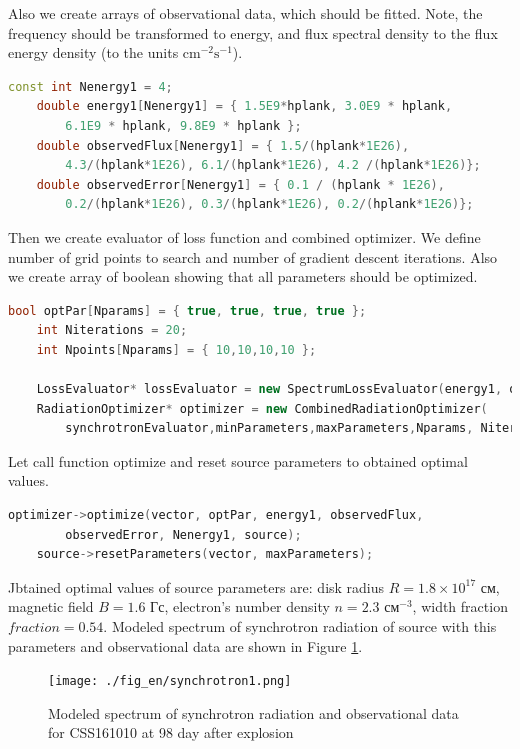 Also we create arrays of observational data, which should be fitted. Note, the frequency should be transformed to energy, and flux spectral density to the flux energy density (to the units $\text{cm}^{-2}\text{s}^{-1}$). 
\begin{lstlisting}[language=c++]
    const int Nenergy1 = 4;
    double energy1[Nenergy1] = { 1.5E9*hplank, 3.0E9 * hplank, 
    	6.1E9 * hplank, 9.8E9 * hplank };
    double observedFlux[Nenergy1] = { 1.5/(hplank*1E26), 
    	4.3/(hplank*1E26), 6.1/(hplank*1E26), 4.2 /(hplank*1E26)};
    double observedError[Nenergy1] = { 0.1 / (hplank * 1E26), 
    	0.2/(hplank*1E26), 0.3/(hplank*1E26), 0.2/(hplank*1E26)};
\end{lstlisting}
Then we create evaluator of loss function and combined optimizer. We define number of grid points to search and number of gradient descent iterations. Also we create array of boolean showing that all parameters should be optimized.
\begin{lstlisting}[language=c++]
    bool optPar[Nparams] = { true, true, true, true };
    int Niterations = 20;
    int Npoints[Nparams] = { 10,10,10,10 };
    
    LossEvaluator* lossEvaluator = new SpectrumLossEvaluator(energy1, observedFlux, observedError, Nenergy1, source);
    RadiationOptimizer* optimizer = new CombinedRadiationOptimizer(
        synchrotronEvaluator,minParameters,maxParameters,Nparams, Niterations,Npoints, lossEvaluator);
\end{lstlisting}
Let call function optimize and reset source parameters to obtained optimal values.
\begin{lstlisting}[language=c++]
    optimizer->optimize(vector, optPar, energy1, observedFlux, 
        observedError, Nenergy1, source);
    source->resetParameters(vector, maxParameters);
\end{lstlisting}
Jbtained optimal values of source parameters are: disk radius $R = 1.8\times10^17 \text{ см}$, magnetic field $B = 1.6 \text{ Гс}$, electron's number density $n = 2.3 \text{ см}^{-3}$, width fraction $fraction = 0.54 $. 
Modeled spectrum of synchrotron radiation of source with this parameters and observational data are shown in Figure \ref{synchrotron1}.
\begin{figure}[h]
	\centering
	\texttt{[image: ./fig\_en/synchrotron1.png]} 
	\caption{Modeled spectrum of synchrotron radiation and observational data for CSS161010 at 98 day after explosion}
	\label{synchrotron1}
\end{figure}


